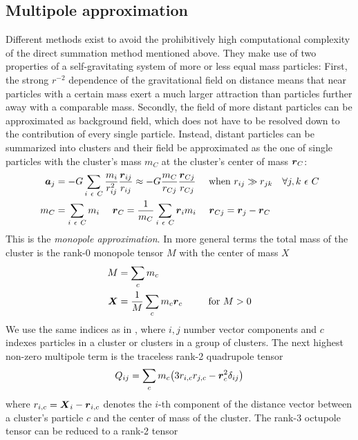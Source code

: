 \subsection{Multipole approximation}
Different methods exist to avoid the prohibitively high computational complexity of the direct summation method mentioned above.  They make use of two properties of a self-gravitating system of more or less equal mass particles: First, the strong $r^{-2}$ dependence of the gravitational field on distance means that near particles with a certain mass exert a much larger attraction than particles further away with a comparable mass. Secondly, the field of more distant particles can be approximated as background field, which does not have to be resolved down to the contribution of every single particle. Instead, distant particles can be summarized into clusters and their field be approximated as the one of single particles with the cluster's mass $m_C$ at the cluster's center of mass $\boldsymbol{r}_C$:
\begin{align}
\label{ch02_grav02_eq001}
\boldsymbol{a}_j &= - G \sum_{i~\epsilon~C} \frac{m_i}{r_{ij}^2} \frac{\boldsymbol{r}_{ij}}{r_{ij}} \approx - G \frac{m_{C}}{r_{Cj}} \frac{\boldsymbol{r}_{Cj}}{r_{Cj}} ~~~~ \text{when}~r_{ij} \gg r_{jk} ~~~ \forall j,k ~ \epsilon~C \\
m_C &= \sum_{i~\epsilon~C} m_i ~~~~ \boldsymbol{r}_C = \frac{1}{m_C} \sum_{i~\epsilon~C} \boldsymbol{r}_i m_i ~~~~ \boldsymbol{r}_{Cj} = \boldsymbol{r}_j - \boldsymbol{r}_C 
\end{align}
This is the \emph{monopole approximation}. In more general terms the total mass of the cluster is the rank-0 monopole tensor $M$ with the center of mass $X$
\begin{align}
\label{ch02_grav02_eq002}
M & = \sum_{c} m_{c} \\
\boldsymbol{X}  & = \frac{1}{M} \sum_{c} m_{c} \boldsymbol{r}_{c} ~~~~~~~~ \text{for}~M > 0
\end{align}
We use the same indices as in \cite{McMillan:1993p43}, where $i,j$ number vector components and $c$ indexes particles in a cluster or clusters in a group of clusters. The next highest non-zero multipole term is the traceless rank-2 quadrupole tensor
\begin{equation}
\label{ch02_grav02_eq003}
Q_{ij} = \sum_{c} m_c \big( 3 r_{i, c} r_{j, c} - \boldsymbol{r}_{c}^2 \delta_{i j} \big) \\
\end{equation}
where $r_{i,c} = \boldsymbol{X}_i - \boldsymbol{r}_{i,c}$ denotes the $i$-th component of the distance vector between a cluster's particle $c$ and the center of mass of the cluster. The rank-3 octupole tensor can be reduced to a rank-2 tensor 
